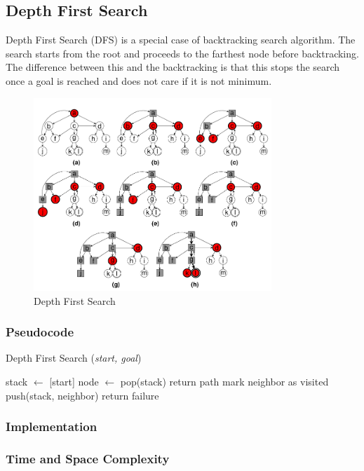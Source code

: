 \subsection{Depth First Search}
\noindent Depth First Search (DFS) is a special case of backtracking search algorithm. The search starts from the root and proceeds to the farthest node before backtracking. The difference between this and the backtracking is that this stops the search once a goal is reached and does not care if it is not minimum.

\begin{figure}[H]
	\centering
	\includegraphics[width=0.8\textwidth]{./imgs/dfs.png}
	\caption{Depth First Search}
\end{figure}

\subsubsection{Pseudocode}
\begin{algorithm}[H]
	\caption{Depth First Search (\textit{start, goal})}\label{alg:dfs}
	\begin{algorithmic}[1]
	\State stack \(\gets\) [start]
		\State node \(\gets\) pop(stack)
			\State return path
		\EndIf
				\State mark neighbor as visited
				\State push(stack, neighbor)
			\EndIf
		\EndFor
	\EndWhile
	\State return failure
	\end{algorithmic}
\end{algorithm}

\subsubsection{Implementation}

\subsubsection{Time and Space Complexity}